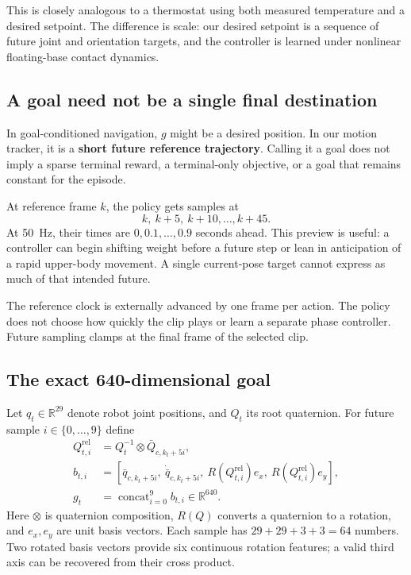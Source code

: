 \documentclass[11pt,a4paper]{article}
\newcommand{\R}{\mathbb{R}}
\begin{document}
This is closely analogous to a thermostat using both measured temperature and a
desired setpoint. The difference is scale: our desired setpoint is a sequence of
future joint and orientation targets, and the controller is learned under
nonlinear floating-base contact dynamics.

\subsection{A goal need not be a single final destination}
In goal-conditioned navigation, $g$ might be a desired position. In our motion
tracker, it is a \textbf{short future reference trajectory}. Calling it a goal
does not imply a sparse terminal reward, a terminal-only objective, or a goal that
remains constant for the episode.

At reference frame $k$, the policy gets samples at
\begin{equation}
k,\ k+5,\ k+10,\ldots,k+45.
\end{equation}
At 50~Hz, their times are $0,0.1,\ldots,0.9$ seconds ahead. This preview is useful:
a controller can begin shifting weight before a future step or lean in
anticipation of a rapid upper-body movement. A single current-pose target cannot
express as much of that intended future.

The reference clock is externally advanced by one frame per action. The policy
does not choose how quickly the clip plays or learn a separate phase controller.
Future sampling clamps at the final frame of the selected clip.

\subsection{The exact 640-dimensional goal}
Let $q_t\in\R^{29}$ denote robot joint positions, and $Q_t$ its root quaternion.
For future sample $i\in\{0,\ldots,9\}$ define
\begin{align}
Q^{\mathrm{rel}}_{t,i}&=Q_t^{-1}\otimes\bar Q_{c,k_t+5i},\\
b_{t,i}&=\left[
\bar q_{c,k_t+5i},\ \dot{\bar q}_{c,k_t+5i},\
R(Q^{\mathrm{rel}}_{t,i})e_x,\ R(Q^{\mathrm{rel}}_{t,i})e_y
\right],\\
g_t&=\operatorname{concat}_{i=0}^{9} b_{t,i}\in\R^{640}.
\end{align}
Here $\otimes$ is quaternion composition, $R(Q)$ converts a quaternion to a
rotation, and $e_x,e_y$ are unit basis vectors. Each sample has
$29+29+3+3=64$ numbers. Two rotated basis vectors provide six continuous rotation
features; a valid third axis can be recovered from their cross product.
\end{document}
